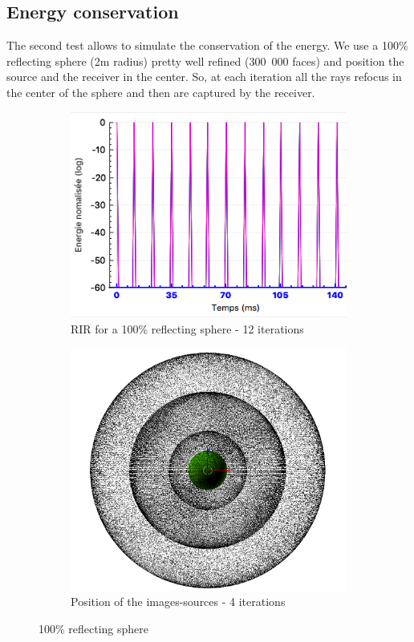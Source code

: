 \documentclass[AMA,STIX1COL]{WileyNJD-v2}
\begin{document}
\subsection {Energy conservation}
The second test allows to simulate the conservation of the energy. We use a 100\% reflecting sphere (2m radius) pretty well refined (300~000 faces) and position the source and the receiver in the center. So, at each iteration all the rays refocus in the center of the sphere and then are captured by the receiver.
\begin{figure}
\centering
	\begin{subfigure}{0.45\textwidth}
		\includegraphics[width=\linewidth]{test2RIR}
		\caption{RIR for a 100\% reflecting sphere - 12 iterations}
		\label{test2RIR}
	\end{subfigure}
	\quad
	\begin{subfigure}{0.38\textwidth}
		\includegraphics[width=\linewidth]{test2SI}
		\caption{Position of the images-sources - 4 iterations}
		\label{test2SI}
	\end{subfigure}
	\caption{100\% reflecting sphere}
\end{figure}
\end{document}
